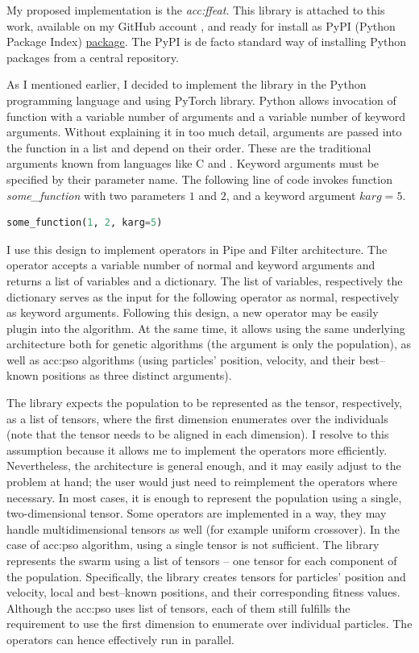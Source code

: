My proposed implementation is the \emph{\acrfull{acc:ffeat}}. This library is attached to this work, available on my GitHub account \citep{FFEATrepo}, and ready for install as PyPI (Python Package Index) \href{https://pypi.org/project/FFEAT/}{package}. The PyPI is de facto standard way of installing Python packages from a central repository.

As I mentioned earlier, I decided to implement the library in the Python programming language and using PyTorch library. Python allows invocation of function with a variable number of arguments and a variable number of keyword arguments. Without explaining it in too much detail, arguments are passed into the function in a list and depend on their order. These are the traditional arguments known from languages like C and \cppns. Keyword arguments must be specified by their parameter name. The following line of code invokes function \textit{some\_function} with two parameters $1$ and $2$, and a keyword argument $karg=5$.

\begin{lstlisting}[language=Python]
some_function(1, 2, karg=5)
\end{lstlisting}

I use this design to implement operators in Pipe and Filter architecture. The operator accepts a variable number of normal and keyword arguments and returns a list of variables and a dictionary. The list of variables, respectively the dictionary serves as the input for the following operator as normal, respectively as keyword arguments. Following this design, a new operator may be easily plug\-in into the algorithm. At the same time, it allows using the same underlying architecture both for genetic algorithms (the argument is only the population), as well as \acrshort{acc:pso} algorithms (using particles' position, velocity, and their best--known positions as three distinct arguments).

The library expects the population to be represented as the tensor, respectively, as a list of tensors, where the first dimension enumerates over the individuals (note that the tensor needs to be aligned in each dimension). I resolve to this assumption because it allows me to implement the operators more efficiently. Nevertheless, the architecture is general enough, and it may easily adjust to the problem at hand; the user would just need to reimplement the operators where necessary. In most cases, it is enough to represent the population using a single, two-dimensional tensor. Some operators are implemented in a way, they may handle multidimensional tensors as well (for example uniform crossover). In the case of \acrshort{acc:pso} algorithm, using a single tensor is not sufficient. The library represents the swarm using a list of tensors -- one tensor for each component of the population. Specifically, the library creates tensors for particles' position and velocity, local and best--known positions, and their corresponding fitness values. Although the \acrshort{acc:pso} uses list of tensors, each of them still fulfills the requirement to use the first dimension to enumerate over individual particles. The operators can hence effectively run in parallel.

